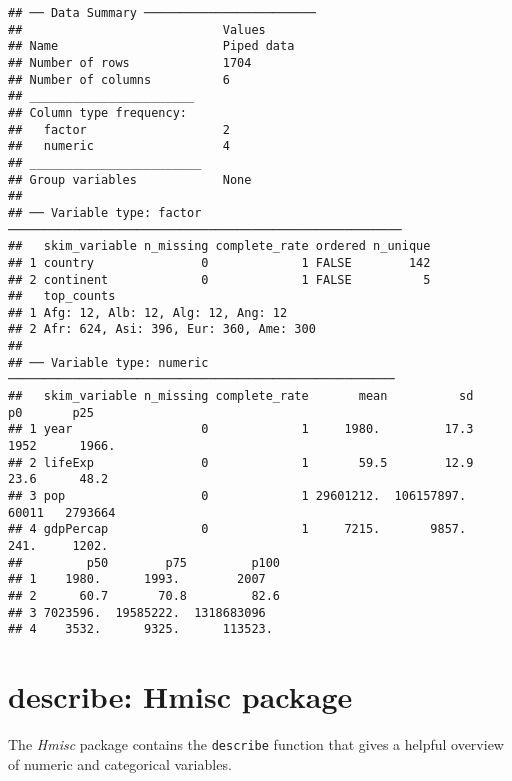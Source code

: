 \documentclass[]{book}
\newenvironment{Shaded}{\begin{snugshade}}{\end{snugshade}}
\newcommand{\KeywordTok}[1]{\textcolor[rgb]{0.13,0.29,0.53}{\textbf{#1}}}
\newcommand{\StringTok}[1]{\textcolor[rgb]{0.31,0.60,0.02}{#1}}
\newcommand{\OperatorTok}[1]{\textcolor[rgb]{0.81,0.36,0.00}{\textbf{#1}}}
\newcommand{\NormalTok}[1]{#1}
\begin{document}
\begin{verbatim}
## ── Data Summary ────────────────────────
##                            Values    
## Name                       Piped data
## Number of rows             1704      
## Number of columns          6         
## _______________________              
## Column type frequency:               
##   factor                   2         
##   numeric                  4         
## ________________________             
## Group variables            None      
## 
## ── Variable type: factor ───────────────────────────────────────────────────────
##   skim_variable n_missing complete_rate ordered n_unique
## 1 country               0             1 FALSE        142
## 2 continent             0             1 FALSE          5
##   top_counts                            
## 1 Afg: 12, Alb: 12, Alg: 12, Ang: 12    
## 2 Afr: 624, Asi: 396, Eur: 360, Ame: 300
## 
## ── Variable type: numeric ──────────────────────────────────────────────────────
##   skim_variable n_missing complete_rate       mean          sd      p0       p25
## 1 year                  0             1     1980.         17.3  1952      1966. 
## 2 lifeExp               0             1       59.5        12.9    23.6      48.2
## 3 pop                   0             1 29601212.  106157897.  60011   2793664  
## 4 gdpPercap             0             1     7215.       9857.    241.     1202. 
##         p50        p75         p100
## 1    1980.      1993.        2007  
## 2      60.7       70.8         82.6
## 3 7023596.  19585222.  1318683096  
## 4    3532.      9325.      113523.
\end{verbatim}

\section{describe: Hmisc package}\label{describe-hmisc-package}

The \emph{Hmisc} package contains the \texttt{describe} function that
gives a helpful overview of numeric and categorical variables.

\begin{Shaded}
\end{Shaded}
\end{document}
